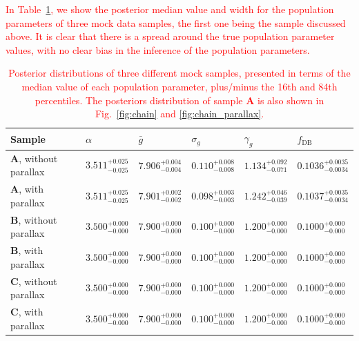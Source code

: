 \documentclass[fleqn,usenatbib]{mnras}
\newcommand{\changes}[1]{\textcolor{red}{#1}}
\begin{document}
\changes{
In Table~\ref{tab:posteriors}, we show the posterior median value and width for the population parameters of three mock data samples, the first one being the sample discussed above. It is clear that there is a spread around the true population parameter values, with no clear bias in the inference of the population parameters.
}

\begin{table}
	\centering
	\caption{\changes{Posterior distributions of three different mock samples, presented in terms of the median value of each population parameter, plus/minus the 16th and 84th percentiles. The posteriors distribution of sample \textbf{A} is also shown in Fig.~\ref{fig:chain} and \ref{fig:chain_parallax}.}}
	\label{tab:posteriors}
    \begin{tabular}{l l l l l l}
		\hline
		Sample  & $\alpha$ & $\bar{g}$ & $\sigma_g$ & $\gamma_g$ & $f_\text{DB}$  \\
		\hline
		\textbf{A}, without parallax &
			$3.511^{+0.025}_{-0.025}$ & 
			$7.906^{+0.004}_{-0.004}$ & 
			$0.110^{+0.008}_{-0.008}$ & 
			$1.134^{+0.092}_{-0.071}$ & 
			$0.1036^{+0.0035}_{-0.0034}$ \vspace{2pt} \\
		\textbf{A}, with parallax &
			$3.511^{+0.025}_{-0.025}$ &
			$7.901^{+0.002}_{-0.002}$ & 
			$0.098^{+0.003}_{-0.003}$ &
			$1.242^{+0.046}_{-0.039}$ &
			$0.1037^{+0.0035}_{-0.0034}$ \\
		\hline
		\textbf{B}, without parallax &
			$3.500^{+0.000}_{-0.000}$ & 
			$7.900^{+0.000}_{-0.000}$ & 
			$0.100^{+0.000}_{-0.000}$ & 
			$1.200^{+0.000}_{-0.000}$ & 
			$0.1000^{+0.000}_{-0.000}$ \vspace{2pt} \\
		\textbf{B}, with parallax &
			$3.500^{+0.000}_{-0.000}$ & 
			$7.900^{+0.000}_{-0.000}$ & 
			$0.100^{+0.000}_{-0.000}$ & 
			$1.200^{+0.000}_{-0.000}$ & 
			$0.1000^{+0.000}_{-0.000}$ \\
		\hline
			\textbf{C}, without parallax &
			$3.500^{+0.000}_{-0.000}$ & 
			$7.900^{+0.000}_{-0.000}$ & 
			$0.100^{+0.000}_{-0.000}$ & 
			$1.200^{+0.000}_{-0.000}$ & 
			$0.1000^{+0.000}_{-0.000}$ \vspace{2pt} \\
		\textbf{C}, with parallax &
			$3.500^{+0.000}_{-0.000}$ & 
			$7.900^{+0.000}_{-0.000}$ & 
			$0.100^{+0.000}_{-0.000}$ & 
			$1.200^{+0.000}_{-0.000}$ & 
			$0.1000^{+0.000}_{-0.000}$ \\
		\hline
	\end{tabular}
\end{table}
\end{document}
